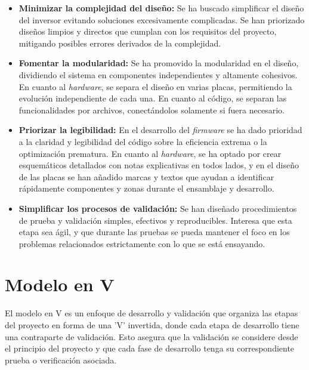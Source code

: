 \begin{itemize}
	\item \textbf{Minimizar la complejidad del diseño:} Se ha buscado simplificar el diseño del inversor evitando soluciones excesivamente complicadas. Se han priorizado diseños limpios y directos que cumplan con los requisitos del proyecto, mitigando posibles errores derivados de la complejidad.
	
	\item \textbf{Fomentar la modularidad:} Se ha promovido la modularidad en el diseño, dividiendo el sistema en componentes independientes y altamente cohesivos. En cuanto al \textit{hardware}, se separa el diseño en varias placas, permitiendo la evolución independiente de cada una. En cuanto al código, se separan las funcionalidades por archivos, conectándolos solamente si fuera necesario.
		
	\item \textbf{Priorizar la legibilidad:} En el desarrollo del \textit{firmware} se ha dado prioridad a la claridad y legibilidad del código sobre la eficiencia extrema o la optimización prematura. En cuanto al \textit{hardware}, se ha optado por crear esquemáticos detallados con notas explicativas en todos lados, y en el diseño de las placas se han añadido marcas y textos que ayudan a identificar rápidamente componentes y zonas durante el ensamblaje y desarrollo.
	
	\item \textbf{Simplificar los procesos de validación:} Se han diseñado procedimientos de prueba y validación simples, efectivos y reproducibles. Interesa que esta etapa sea ágil, y que durante las pruebas se pueda mantener el foco en los problemas relacionados estrictamente con lo que se está ensayando.	
	
\end{itemize}

\section{Modelo en V}
El modelo en V es un enfoque de desarrollo y validación que organiza las etapas del proyecto en forma de una 'V' invertida, donde cada etapa de desarrollo tiene una contraparte de validación. Esto asegura que la validación se considere desde el principio del proyecto y que cada fase de desarrollo tenga su correspondiente prueba o verificación asociada.

